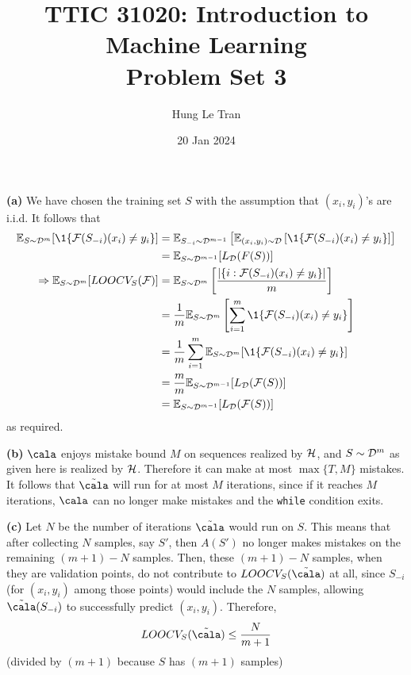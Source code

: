 \documentclass[a4paper, 12pt]{article}
\title{TTIC 31020: Introduction to Machine Learning \\ \large Problem Set 3}
\date{20 Jan 2024}
\author{Hung Le Tran}
\begin{document}
\maketitle
\setcounter{section}{3}
\newcommand*{\tcala}{\tilde{\cala}}
\begin{problem} [Problem 1]
\end{problem}
\textbf{(a)}
We have chosen the training set $S$ with the assumption that $(x_i, y_i)$'s are i.i.d. It follows that
\begin{align*}
     \bbe_{S \sim \cald^m} [\1\{\calf(S_{-i})(x_i) \neq y_i\}] &= \bbe_{S_{-i} \sim \cald^{m-1}}\left[\bbe_{(x_i, y_i) \sim \cald}\left[\1\{\calf(S_{-i})(x_i) \neq y_i\}\right]\right] \\
     &= \bbe_{S\sim \cald^{m-1}}[L_{\cald}(F(S))] \\
     \implies \bbe_{S \sim \cald^m} [LOOCV_S (\calf)] &= \bbe_{S \sim \cald^m}\left[\frac{\abs{\{i : \calf(S_{-i})(x_i) \neq y_i\}}}{m} \right] \\
     &= \frac{1}{m}\bbe_{S \sim \cald^m} \left[\sum_{i=1}^{m} \1\{\calf(S_{-i})(x_i) \neq y_i\}\right] \\
     &= \frac{1}{m} \sum_{i=1}^{m} \bbe_{S \sim \cald^m} [\1\{\calf(S_{-i})(x_i) \neq y_i\}]   \\
     &= \frac{m}{m} \bbe_{S\sim \cald^{m-1}}[L_{\cald}(\calf(S))] \\
     &= \bbe_{S\sim \cald^{m-1}}[L_{\cald}(\calf(S))]
\end{align*}
as required.

\textbf{(b)} $\cala$ enjoys mistake bound $M$ on sequences realized by $\mathcal{H}$, and $S \sim \mathcal{D}^m$ as given here is realized by $\mathcal{H}$. Therefore it can make at most $\max \{T, M\}$ mistakes. It follows that $\tcala$ will run for at most $M$ iterations, since if it reaches $M$ iterations, $\cala$ can no longer make mistakes and the \verb|while| condition exits.

\textbf{(c)} Let $N$ be the number of iterations $\tcala$ would run on $S$. This means that after collecting $N$ samples, say $S'$, then $A(S')$ no longer makes mistakes on the remaining $(m+1) - N$ samples. Then, these $(m+1) - N$ samples, when they are validation points, do not contribute to $LOOCV_S(\tcala)$ at all, since $S_{-i}$ (for $(x_i, y_i)$ among those points) would include the $N$ samples, allowing $\tcala(S_{-i})$ to successfully predict $(x_i, y_i)$. Therefore, \begin{equation*}
    LOOCV_S (\tcala) \leq \frac{N}{m+1} \\
\end{equation*}
(divided by $(m+1)$ because $S$ has $(m+1)$ samples)
\end{document}
